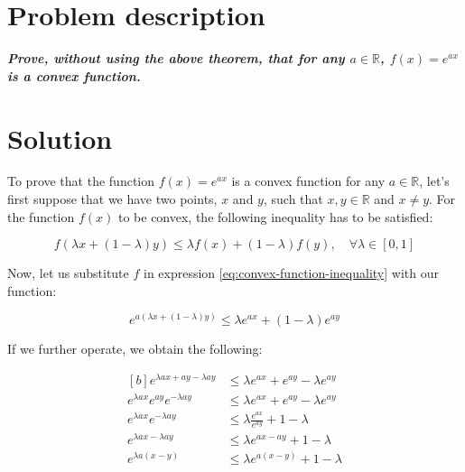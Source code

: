 \documentclass[11pt,a4paper]{article}
\begin{document}
\setlength{\parskip}{1em}


\section{Problem description}

\emph{\textbf{Prove, without using the above theorem, that for any
$a \in \mathbb{R}$, $f(x) = e^{ax}$ is a convex function.}}

\section{Solution}

To prove that the function $f(x) = e^{ax}$ is a convex function for any $a \in \mathbb{R}$,
let's first suppose that we have two points, $x$ and $y$, such that $x, y \in \mathbb{R}$ and $x \neq y$.
For the function $f(x)$ to be convex, the following inequality has to be satisfied:

\begin{equation}
  \label{eq:convex-function-inequality}
  f(\lambda x + (1 - \lambda)y) \leq \lambda f(x) + (1 - \lambda)f(y), \quad \forall \lambda \in [0, 1]
\end{equation}

Now, let us substitute $f$ in expression \eqref{eq:convex-function-inequality} with our function:

\begin{equation}
  \label{eq:exponential-inequality}
  e^{a(\lambda x + (1 - \lambda)y)} \leq \lambda e^{ax} + (1 - \lambda)e^{ay}
\end{equation}

If we further operate, we obtain the following:

\begin{equation}
  \label{eq:exponential-operations}
  \begin{aligned}[b]
    e^{\lambda ax + ay - \lambda ay} &\leq \lambda e^{ax} + e^{ay} - \lambda e^{ay} \\
    e^{\lambda ax} e^{ay} e^{-\lambda ay} &\leq \lambda e^{ax} + e^{ay} - \lambda e^{ay} \\
    e^{\lambda ax} e^{-\lambda ay} &\leq \lambda \frac{e^{ax}}{e^{ay}} + 1 - \lambda \\
    e^{\lambda ax - \lambda ay} &\leq \lambda e^{ax - ay} + 1 - \lambda \\
    e^{\lambda a(x - y)} &\leq \lambda e^{a(x - y)} + 1 - \lambda
  \end{aligned}
\end{equation}
\end{document}
